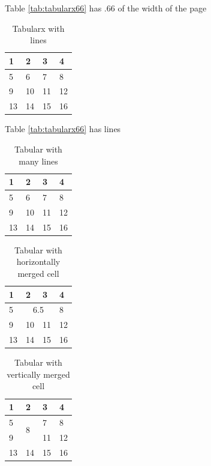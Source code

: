 \documentclass{scrartcl}
\begin{document}
Table \ref{tab:tabularx66} has .66 of the width of the page



\begin{table}
\begin{tabularx}{\textwidth}{XXXX}
\toprule
 1&2&3&4\\
 \midrule 
 5&6&7&8\\
 9&10&11&12\\
 13&14&15&16\\
 \bottomrule
\end{tabularx}
\caption{Tabularx with lines}
\label{tab:tabularxrules}
\end{table}

Table \ref{tab:tabularx66} has lines



\begin{table}
\begin{tabularx}{\textwidth}{XXXX}
\hline
 1&2&3&4\\
\hline
 5&6&7&8\\
\hline
 9&10&11&12\\
\hline
 13&14&15&16\\
 \hline
\end{tabularx}
\caption{Tabular with many lines}
\label{tab:tabularxhline}
\end{table}



\begin{table}
\begin{tabularx}{\textwidth}{|X|X|X|X|}
\hline
 1&2&3&4\\
\hline
 5&\multicolumn{2}{c|}{6.5}&8\\
\hline
 9&10&11&12\\
\hline
 13&14&15&16\\
 \hline
\end{tabularx}
\caption{Tabular with horizontally merged cell}
\label{tab:tabularxmulticolumns}
\end{table}


\begin{table}
\begin{tabularx}{\textwidth}{|X|X|X|X|}
\hline
 1&2&3&4\\
\hline
 5&\multirow{2}{*}{8}& 7 &8\\
\cline{1-1}\cline{3-4}
 9& &11&12\\
\hline
 13&14&15&16\\
 \hline
\end{tabularx}
\caption{Tabular with vertically merged cell}
\label{tab:tabularxmultirow}
\end{table}
 
\end{document}
